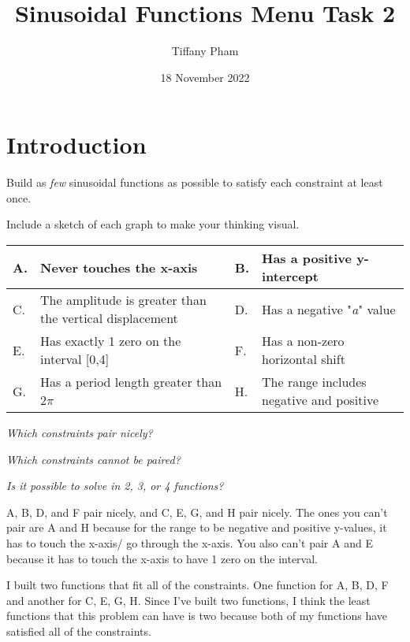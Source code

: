 \documentclass[pstricks,border=11pt]{article}
\title{Sinusoidal Functions Menu Task 2}
\author{Tiffany Pham}
\date{18 November 2022}
\begin{document}
\maketitle

\section{Introduction}
Build as \textit{few} sinusoidal functions as possible to satisfy each constraint at least once.
\vspace{5mm}
\begin{center}
Include a sketch of each graph to make your thinking visual.
\end{center}

\begin{table}[!ht]
\begin{tabular}{|l|p{2in}|l|p{2in}|} 
\hline
A. & Never touches the x-axis                                & B. & Has a positive y-intercept                \\ 
\hline
C. & The amplitude is greater than the vertical displacement & D. & Has a negative "\textit{a}" value         \\ 
\hline
E. & Has exactly 1 zero on the interval [0,4]                & F. & Has a non-zero horizontal shift           \\ 
\hline
G. & Has a period length greater than 2$\pi$                     & H. & The range includes negative and positive  \\
\hline
\end{tabular}
\end{table}
\begin{center}
    \textit{Which constraints pair nicely?}
    
    \textit{Which constraints cannot be paired?}
    
    \textit{Is it possible to solve in 2, 3, or 4 functions?}
\end{center}

A, B, D, and F pair nicely, and C, E, G, and H pair nicely. The ones you can't pair are A and H because for the range to be negative and positive y-values, it has to touch the x-axis/ go through the x-axis. You also can't pair A and E because it has to touch the x-axis to have 1 zero on the interval.

I built two functions that fit all of the constraints. One function for A, B, D, F and another for C, E, G, H. Since I've built two functions, I think the least functions that this problem can have is two because both of my functions have satisfied all of the constraints.
\end{document}
